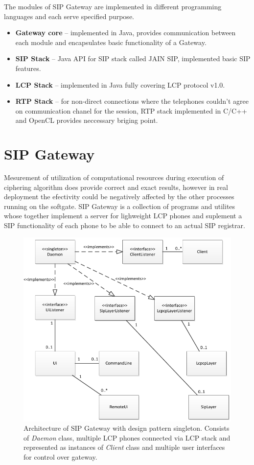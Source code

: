 The modules of SIP Gateway are implemented in different programming languages
and each serve specified purpose.
\begin{itemize}
\item \textbf{Gateway core} -- implemented in Java, provides communication 
between each module and encapsulates basic functionality of a Gateway.
\item \textbf{SIP Stack} -- Java API for SIP stack called JAIN SIP\cite{jainsip}, 
implemented basic SIP features.
\item \textbf{LCP Stack} -- implemented in Java fully covering LCP protocol v1.0.
\item \textbf{RTP Stack} -- for non-direct connections where the telephones 
couldn't agree on communication chanel for the session, RTP stack implemented in 
C/C++ and OpenCL provides neccessary briging point.
\end{itemize}


\section{SIP Gateway}
Mesurement of utilization of computational resources during execution of 
ciphering algorithm does provide correct and exact results, however in real 
deployment the efectivity could be negatively affected by the other processes 
running on the softgate. SIP Gateway is a collection of programs and utilites
whose together implement a server for lighweight LCP phones and suplement a
SIP functionality of each phone to be able to connect to an actual SIP 
registrar. 

\begin{figure}[H]
\centering
\includegraphics[width=14cm]{fig/sipgw.pdf}
\caption{Architecture of SIP Gateway with design pattern singleton. Consists
of \textit{Daemon} class, multiple LCP phones connected via LCP stack and 
represented as instances of \textit{Client} class and multiple user interfaces
for control over gateway.}
\label{oclpm}
\end{figure}

